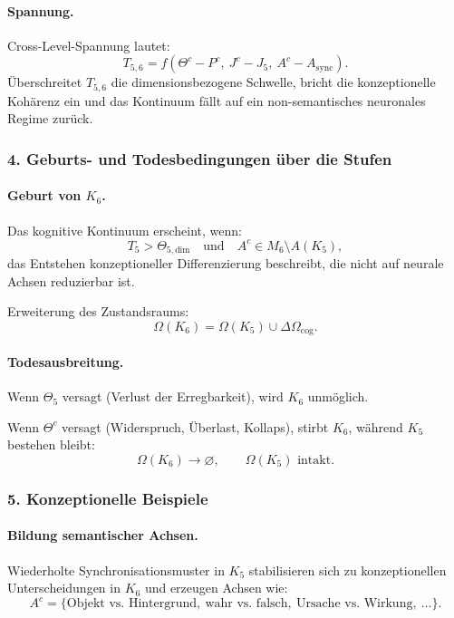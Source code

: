 \paragraph{Spannung.}
Cross-Level-Spannung lautet:
\[
T_{5,6} = f(\Theta^{c} - P^{c},\ J^{c} - J_5,\ A^{c} - A_{\mathrm{sync}}).
\]
Überschreitet $T_{5,6}$ die dimensionsbezogene Schwelle, bricht die konzeptionelle
Kohärenz ein und das Kontinuum fällt auf ein non-semantisches neuronales Regime
zurück.

\subsubsection{4. Geburts- und Todesbedingungen über die Stufen}

\paragraph{Geburt von \texorpdfstring{$K_6$}{K_6}.}
Das kognitive Kontinuum erscheint, wenn:
\[
T_5 > \Theta_{5,\mathrm{dim}}
\quad\text{und}\quad
A^{c} \in M_6 \setminus A(K_5),
\]
das Entstehen konzeptioneller Differenzierung beschreibt, die nicht auf
neurale Achsen reduzierbar ist.

Erweiterung des Zustandsraums:
\[
\Omega(K_6) = \Omega(K_5) \cup \Delta\Omega_{\mathrm{cog}}.
\]

\paragraph{Todesausbreitung.}
Wenn $\Theta_5$ versagt (Verlust der Erregbarkeit), wird $K_6$ unmöglich.

Wenn $\Theta^{c}$ versagt (Widerspruch, Überlast, Kollaps), stirbt $K_6$, während
$K_5$ bestehen bleibt:
\[
\Omega(K_6) \rightarrow \varnothing,
\qquad
\Omega(K_5) \text{ intakt}.
\]

\subsubsection{5. Konzeptionelle Beispiele}

\paragraph{Bildung semantischer Achsen.}
Wiederholte Synchronisationsmuster in $K_5$ stabilisieren sich zu konzeptionellen
Unterscheidungen in $K_6$ und erzeugen Achsen wie:
\[
A^{c} = \{\text{Objekt vs. Hintergrund},\ \text{wahr vs. falsch},\
         \text{Ursache vs. Wirkung},\ \ldots\}.
\]

